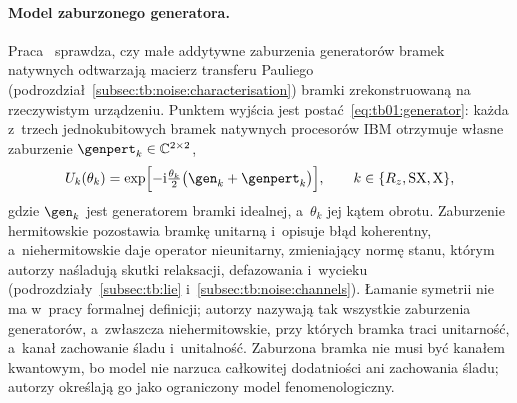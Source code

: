 \paragraph{Model zaburzonego generatora.}
Praca~\cite{raubitzek_quantum_noise} sprawdza, czy małe addytywne zaburzenia generatorów bramek natywnych odtwarzają macierz transferu Pauliego (podrozdział~\ref{subsec:tb:noise:characterisation}) bramki zrekonstruowaną na rzeczywistym urządzeniu.
Punktem wyjścia jest postać~\eqref{eq:tb01:generator}: każda z~trzech jednokubitowych bramek natywnych procesorów IBM otrzymuje własne zaburzenie $\genpert_k\in\mathbb{C}^{2\times2}$,
\begin{equation}\label{eq:ns:perturbed}
U_k(\theta_k)=\exp\Bigl[-\mathrm{i}\tfrac{\theta_k}{2}\bigl(\gen_k+\genpert_k\bigr)\Bigr],\qquad k\in\{R_z,\mathrm{SX},\mathrm{X}\},
\end{equation}
gdzie $\gen_k$ jest generatorem bramki idealnej, a~$\theta_k$ jej kątem obrotu.
Zaburzenie hermitowskie pozostawia bramkę unitarną i~opisuje błąd koherentny, a~niehermitowskie daje operator nieunitarny, zmieniający normę stanu, którym autorzy naśladują skutki relaksacji, defazowania i~wycieku (podrozdziały~\ref{subsec:tb:lie} i~\ref{subsec:tb:noise:channels}).
Łamanie symetrii nie ma w~pracy formalnej definicji; autorzy nazywają tak wszystkie zaburzenia generatorów, a~zwłaszcza niehermitowskie, przy których bramka traci unitarność, a~kanał zachowanie śladu i~unitalność.
Zaburzona bramka nie musi być kanałem kwantowym, bo model nie narzuca całkowitej dodatniości ani zachowania śladu; autorzy określają go jako ograniczony model fenomenologiczny.

